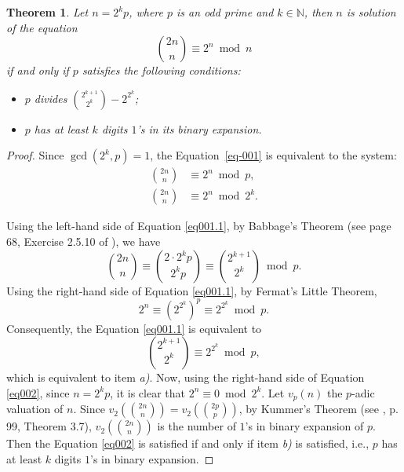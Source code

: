 \documentclass[11pt,a4paper]{article}
\newtheorem{theorem}{Theorem}[section]
\begin{document}
\begin{theorem}\label{thm111}
Let $n=2^k p$, where $p$ is an odd prime and $k\in \mathbb{N}$, then $n$ is solution of the equation
\begin{equation} \label{eq-001}
\binom{2n}{n} \equiv 2^n \bmod n
\end{equation}
if and only if $p$ satisfies the following conditions:
\begin{itemize}
    \item [a)] $p$ divides $\binom{2^{k+1}}{2^k}-2^{2^k}$;
    \item [b)] $p$ has at least $k$ digits $1$'s in its binary expansion.
\end{itemize}
\end{theorem}

\begin{proof}
Since $\gcd(2^k, p)=1$, the Equation~\eqref{eq-001} is equivalent to the system:
\begin{align}
\binom{2n}{n}&\equiv 2^{n} \bmod {p} \label{eq001.1},  \\ 
\binom{2n}{n}&\equiv 2^n \bmod {2^k}\label{eq002}.
\end{align}

Using the left-hand side of Equation \eqref{eq001.1}, by Babbage's Theorem (see page 68, Exercise 2.5.10 of \cite{GRANVILLE}), we have
$$\binom{2n}{n}\equiv \binom{2\cdot 2^k p}{2^k p}\equiv \binom{2^{k+1}}{2^k} \bmod {p}. $$  
Using the right-hand side of Equation \eqref{eq001.1}, by Fermat's Little Theorem,
$$2^n\equiv \left(2^{2^k}\right)^p\equiv 2^{2^k} \bmod {p}.$$
Consequently, the Equation \eqref{eq001.1} is equivalent to
$$\binom{2^{k+1}}{2^k} \equiv 2^{2^k} \bmod {p}, $$
which is equivalent to item  \textit{a)}.  
Now, using the right-hand side of Equation \eqref{eq002}, since $n=2^k p$, \linebreak it is clear that $2^n\equiv 0 \bmod {2^k}$.
Let $v_p(n)$ the $p$-adic valuation of $n$.
Since $v_2\left(\binom{2n}{n}\right)=v_2\left(\binom{2p}{p}\right)$, by Kummer's Theorem  (see \cite{GRANVILLE}, p. 99, Theorem 3.7), $v_2\left(\binom{2n}{n}\right)$ is the number of $1$'s in binary expansion of $p$. Then the Equation \eqref{eq002} is satisfied if and only if item \textit{b)} is satisfied, i.e., $p$ has at least $k$ digits $1$'s in binary expansion.
\end{proof}
\end{document}
